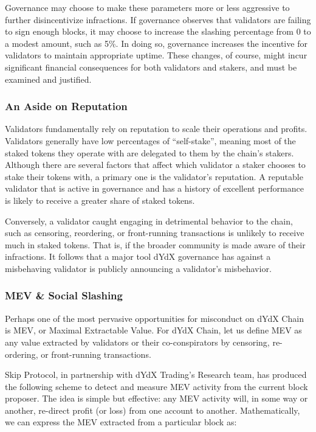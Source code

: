             Governance may choose to make these parameters more or less aggressive to further disincentivize infractions. If governance observes that validators are failing to sign enough blocks, it may choose to increase the slashing percentage from 0 to a modest amount, such as 5\%. In doing so, governance increases the incentive for validators to maintain appropriate uptime. These changes, of course, might incur significant financial consequences for both validators and stakers, and must be examined and justified.

        \subsubsection{An Aside on Reputation}

            Validators fundamentally rely on reputation to scale their operations and profits. Validators generally have low percentages of ``self-stake'', meaning most of the staked tokens they operate with are delegated to them by the chain's stakers. Although there are several factors that affect which validator a staker chooses to stake their tokens with, a primary one is the validator's reputation. A reputable validator that is active in governance and has a history of excellent performance is likely to receive a greater share of staked tokens. 

            Conversely, a validator caught engaging in detrimental behavior to the chain, such as censoring, reordering, or front-running transactions is unlikely to receive much in staked tokens. That is, if the broader community is made aware of their infractions. It follows that a major tool dYdX governance has against a misbehaving validator is publicly announcing a validator's misbehavior.

        \subsubsection{MEV \& Social Slashing}

            Perhaps one of the most pervasive opportunities for misconduct on dYdX Chain is MEV, or Maximal Extractable Value. For dYdX Chain, let us define MEV as any value extracted by validators or their co-conspirators by censoring, re-ordering, or front-running transactions. 

            Skip Protocol, in partnership with dYdX Trading's Research team, has produced the following scheme to detect and measure MEV activity from the current block proposer. The idea is simple but effective: any MEV activity will, in some way or another, re-direct profit (or loss) from one account to another. Mathematically, we can express the MEV extracted from a particular block as:

